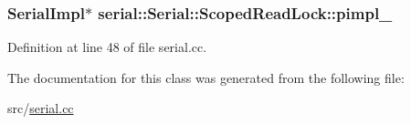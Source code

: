 \subsubsection[{\texorpdfstring{pimpl\+\_\+}{pimpl_}}]{\setlength{\rightskip}{0pt plus 5cm}Serial\+Impl$\ast$ serial\+::\+Serial\+::\+Scoped\+Read\+Lock\+::pimpl\+\_\+\hspace{0.3cm}{\ttfamily [private]}}\hypertarget{class_serial_1_1_scoped_read_lock_ae2220f73a557b57a5349d75282b4bcc6}{}\label{class_serial_1_1_scoped_read_lock_ae2220f73a557b57a5349d75282b4bcc6}


Definition at line 48 of file serial.\+cc.



The documentation for this class was generated from the following file\+:\begin{DoxyCompactItemize}
\item 
src/\hyperlink{serial_8cc}{serial.\+cc}\end{DoxyCompactItemize}
